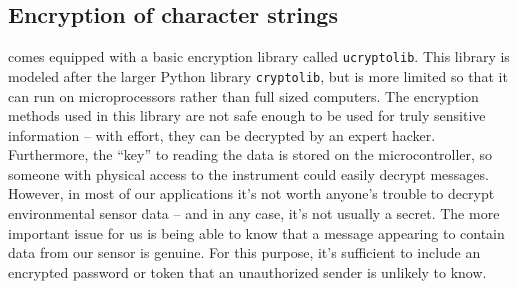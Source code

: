 \subsection{Encryption of character strings}
\Micropython comes equipped with a basic encryption library called \lstinline{ucryptolib}.
This library is modeled after the larger  Python library \lstinline{cryptolib}, but is more limited so that it can run on microprocessors rather than full sized computers.
The encryption methods used in this library are not safe enough to be used for truly sensitive information -- with effort, they can be decrypted by an expert hacker.
Furthermore, the ``key'' to reading the data is stored on the microcontroller, so someone with physical access to the instrument could easily decrypt messages.
However, in most of our applications it's not worth anyone's trouble to decrypt environmental sensor data -- and in any case, it's not usually a secret.
The more important issue for us is being able to know that a message appearing to contain data from our sensor is genuine.
For this purpose, it's sufficient to include an encrypted password or token that an unauthorized sender is unlikely to know.

